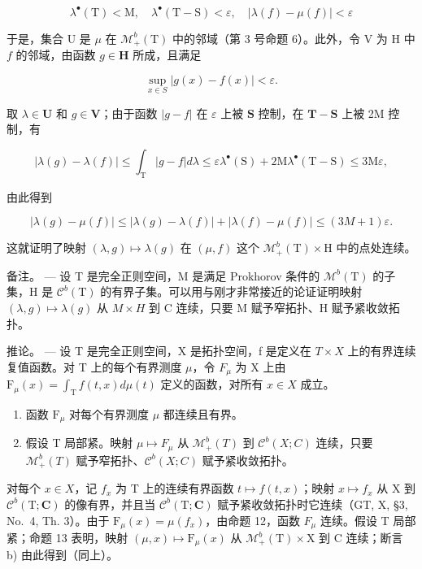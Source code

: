 \[
\lambda^ {\bullet} (\mathrm{T}) <   \mathrm{M}, \quad \lambda^ {\bullet} (\mathrm{T} - \mathrm{S}) <   \varepsilon , \quad | \lambda (f) - \mu (f) | <   \varepsilon
\]

于是，集合 U 是 \(\mu\) 在 \(\mathcal{M}_+^b (\mathrm{T})\) 中的邻域（第 3 号命题 6）。此外，令 V 为 H 中 \(f\) 的邻域，由函数 \(g\in \mathbf{H}\) 所成，且满足

\[
\sup _ {x \in S} | g (x) - f (x) | <   \varepsilon .
\]

取 \(\lambda \in \mathbf{U}\) 和 \(g\in \mathbf{V}\)；由于函数 \(|g - f|\) 在 \(\varepsilon\) 上被 \(\mathbf{S}\) 控制，在 \(\mathbf{T} - \mathbf{S}\) 上被 2M 控制，有

\[
\left| \lambda (g) - \lambda (f) \right| \leqslant \int_ {\mathrm{T}} | g - f | d \lambda \leqslant \varepsilon \lambda^ {\bullet} (\mathrm{S}) + 2 \mathrm{M} \lambda^ {\bullet} (\mathrm{T} - \mathrm{S}) \leqslant 3 \mathrm{M} \varepsilon ,
\]

由此得到

\[
\left| \lambda (g) - \mu (f) \right| \leqslant \left| \lambda (g) - \lambda (f) \right| + \left| \lambda (f) - \mu (f) \right| \leqslant (3 M + 1) \varepsilon .
\]

这就证明了映射 \((\lambda, g) \mapsto \lambda(g)\) 在 \((\mu, f)\) 这个 \(\mathcal{M}_+^b(\mathrm{T}) \times \mathrm{H}\) 中的点处连续。

备注。 --- 设 T 是完全正则空间，M 是满足 Prokhorov 条件的 \(\mathcal{M}^{b}(\mathrm{T})\) 的子集，H 是 \(\mathcal{C}^{b}(\mathrm{T})\) 的有界子集。可以用与刚才非常接近的论证证明映射 \((\lambda,g)\mapsto\lambda(g)\) 从 \(M\times H\) 到 C 连续，只要 M 赋予窄拓扑、H 赋予紧收敛拓扑。

推论。 --- 设 T 是完全正则空间，X 是拓扑空间，f 是定义在 \(T \times X\) 上的有界连续复值函数。对 T 上的每个有界测度 \(\mu\)，令 \(F_{\mu}\) 为 X 上由 \(\mathrm{F}_{\mu}(x) = \int_{\mathrm{T}} f(t, x) d\mu(t)\) 定义的函数，对所有 \(x \in X\) 成立。

\begin{enumerate}
\def\labelenumi{\alph{enumi})}
\item
  函数 \(\mathrm{F}_{\mu}\) 对每个有界测度 \(\mu\) 都连续且有界。
\item
  假设 T 局部紧。映射 \(\mu\mapsto F_{\mu}\) 从 \(\mathcal{M}_{+}^{b}(T)\) 到 \(\mathcal{C}^{b}(X;C)\) 连续，只要 \(\mathcal{M}_{+}^{b}(T)\) 赋予窄拓扑、\(\mathcal{C}^{b}(X;C)\) 赋予紧收敛拓扑。
\end{enumerate}

对每个 \(x \in X\)，记 \(f_{x}\) 为 T 上的连续有界函数 \(t \mapsto f(t, x)\)；映射 \(x \mapsto f_{x}\) 从 X 到 \(\mathcal{C}^{b}(\mathrm{T}; \mathbf{C})\) 的像有界，并且当 \(\mathcal{C}^{b}(\mathrm{T}; \mathbf{C})\) 赋予紧收敛拓扑时它连续（GT, X, §3, No.~4, Th. 3）。由于 \(\mathrm{F}_{\mu}(x) = \mu(f_{x})\)，由命题 12，函数 \(F_{\mu}\) 连续。假设 T 局部紧；命题 13 表明，映射 \((\mu, x) \mapsto \mathrm{F}_{\mu}(x)\) 从 \(\mathcal{M}_{+}^{b}(\mathrm{T}) \times \mathrm{X}\) 到 C 连续；断言 b) 由此得到（同上）。

